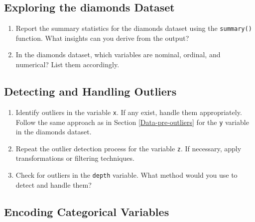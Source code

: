 \documentclass[
]{book}
\newcommand{\passthrough}[1]{#1}
\providecommand{\tightlist}{%
  \setlength{\itemsep}{0pt}\setlength{\parskip}{0pt}}
\theoremstyle{definition}
\theoremstyle{definition}
\theoremstyle{definition}
\theoremstyle{definition}
\theoremstyle{remark}
\begin{document}
\subsection*{Exploring the diamonds Dataset}\label{exploring-the-diamonds-dataset}

\begin{enumerate}
\def\labelenumi{\arabic{enumi}.}
\setcounter{enumi}{2}
\tightlist
\item
  Report the summary statistics for the diamonds dataset using the \passthrough{\lstinline!summary()!} function. What insights can you derive from the output?\\
\item
  In the diamonds dataset, which variables are nominal, ordinal, and numerical? List them accordingly.
\end{enumerate}

\subsection*{Detecting and Handling Outliers}\label{detecting-and-handling-outliers}

\begin{enumerate}
\def\labelenumi{\arabic{enumi}.}
\setcounter{enumi}{4}
\tightlist
\item
  Identify outliers in the variable \passthrough{\lstinline!x!}. If any exist, handle them appropriately. Follow the same approach as in Section \ref{Data-pre-outliers} for the \passthrough{\lstinline!y!} variable in the diamonds dataset.\\
\item
  Repeat the outlier detection process for the variable \passthrough{\lstinline!z!}. If necessary, apply transformations or filtering techniques.\\
\item
  Check for outliers in the \passthrough{\lstinline!depth!} variable. What method would you use to detect and handle them?
\end{enumerate}

\subsection*{Encoding Categorical Variables}\label{encoding-categorical-variables-1}
\end{document}
